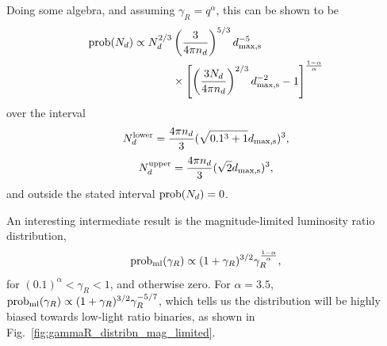 \documentclass{emulateapj}
\begin{document}
Doing some algebra, and assuming $\gamma_R = q^\alpha$, this can be shown to be
\begin{align}
{\rm prob}(N_d) \propto N_d^{2/3} &\left(\frac{3}{4\pi 
	n_d}\right)^{5/3} d_{\rm max,s}^{-5} \ \nonumber\\
&\times \left[ 
	\left(\frac{3 N_d}{4\pi n_d}\right)^{2/3}  d_{\rm max,s}^{-2} - 1
 \right]^{\frac{1-\alpha}{\alpha} }
\end{align}
over the interval
\begin{equation}
N_d^{\rm lower} = \frac{4 \pi n_d}{3} (\sqrt{0.1^3 + 1} d_{\rm max,s})^3,
\end{equation}
\begin{equation}
N_d^{\rm upper} = \frac{4 \pi n_d}{3} (\sqrt{2}d_{\rm max,s})^3,
\end{equation}
and outside the stated interval ${\rm prob}(N_d) = 0$.

An interesting intermediate result is the magnitude-limited luminosity ratio 
distribution,
\begin{equation}
{\rm prob_{ml}}(\gamma_R) \propto (1+\gamma_R)^{3/2} 
\gamma_R^{\frac{1-\alpha}{\alpha}},
\end{equation}
for $(0.1)^{\alpha}<\gamma_R<1$, and otherwise zero.
For $\alpha=3.5$, ${\rm prob_{ml}}(\gamma_R) \propto 
(1+\gamma_R)^{3/2}\gamma_R^{-5/7}$, which tells us the distribution will be 
highly biased towards low-light ratio binaries, as shown in 
Fig.~\ref{fig:gammaR_distribn_mag_limited}.
\end{document}
